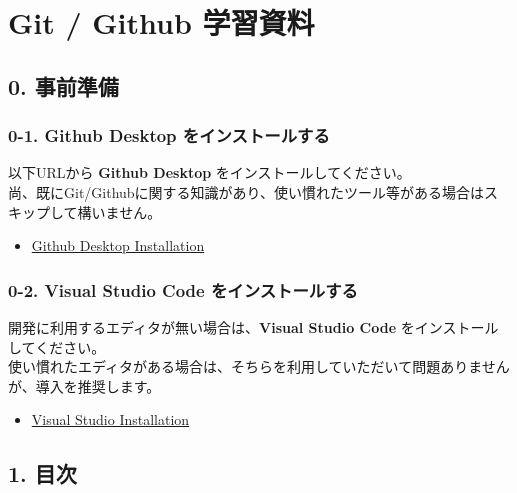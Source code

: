 \section{Git / Github
学習資料}\label{git-github-ux5b66ux7fd2ux8cc7ux6599}

\subsection{0. 事前準備}\label{ux4e8bux524dux6e96ux5099}

\subsubsection{0-1. Github Desktop
をインストールする}\label{github-desktop-ux3092ux30a4ux30f3ux30b9ux30c8ux30fcux30ebux3059ux308b}

以下URLから \textbf{Github Desktop} をインストールしてください。\\
尚、既にGit/Githubに関する知識があり、使い慣れたツール等がある場合はスキップして構いません。

\begin{itemize}
\tightlist
\item
  \href{https://docs.github.com/ja/desktop/installing-and-configuring-github-desktop/installing-and-authenticating-to-github-desktop/installing-github-desktop}{Github
  Desktop Installation}
\end{itemize}

\subsubsection{0-2. Visual Studio Code
をインストールする}\label{visual-studio-code-ux3092ux30a4ux30f3ux30b9ux30c8ux30fcux30ebux3059ux308b}

開発に利用するエディタが無い場合は、\textbf{Visual Studio Code}
をインストールしてください。\\
使い慣れたエディタがある場合は、そちらを利用していただいて問題ありませんが、導入を推奨します。

\begin{itemize}
\tightlist
\item
  \href{https://code.visualstudio.com/}{Visual Studio Installation}
\end{itemize}

\subsection{1. 目次}\label{ux76eeux6b21}

